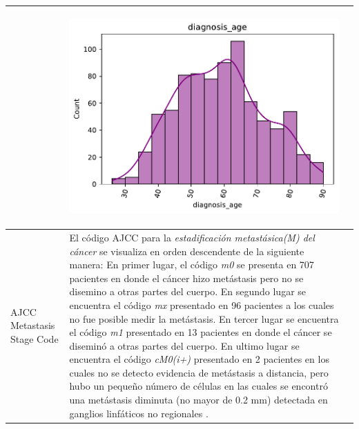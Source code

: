 \begin{table}[!htb]
\begin{threeparttable}
\begin{tabular}{p{2.5cm} p{7cm} p{6.5cm}}
			& \begin{center}\includegraphics[width=1\linewidth]{NOTEBOOK/IMAGENES_DESCRIPTIVAS/1_diagnosis_age}\end{center}
			\\ \hline
			AJCC Metastasis Stage Code 
			& El código AJCC para la \textit{estadificación metastásica(M) del cáncer} se visualiza en orden descendente de la siguiente manera: En primer lugar, el código \textit{m0} se presenta en 707 pacientes en donde el cáncer hizo metástasis pero no se  disemino a otras partes del cuerpo. En segundo lugar se encuentra el código \textit{mx} presentado en 96 pacientes a los cuales no fue posible medir la metástasis. En tercer lugar se encuentra el código \textit{m1} presentado en 13 pacientes en donde el cáncer se diseminó a otras partes del cuerpo. En ultimo lugar se encuentra el código \textit{cM0(i+)} presentado en 2 pacientes en los cuales no se detecto evidencia de metástasis a distancia, pero hubo un pequeño número de células en las cuales se encontró una metástasis diminuta (no mayor de 0.2 mm) detectada en ganglios linfáticos no regionales \cite{NCI}.
			

\end{tabular}
\end{threeparttable}
\end{table}
